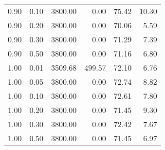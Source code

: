 \begin{table}
\begin{tabular}{rrrrrr}
0.90 & 0.10 & 3800.00 & 0.00 & 75.42 & 10.30 \\
0.90 & 0.20 & 3800.00 & 0.00 & 70.06 & 5.59 \\
0.90 & 0.30 & 3800.00 & 0.00 & 71.29 & 7.39 \\
0.90 & 0.50 & 3800.00 & 0.00 & 71.16 & 6.80 \\
1.00 & 0.01 & 3509.68 & 499.57 & 72.10 & 6.76 \\
1.00 & 0.05 & 3800.00 & 0.00 & 72.74 & 8.82 \\
1.00 & 0.10 & 3800.00 & 0.00 & 72.61 & 7.80 \\
1.00 & 0.20 & 3800.00 & 0.00 & 71.45 & 9.30 \\
1.00 & 0.30 & 3800.00 & 0.00 & 72.42 & 7.67 \\
1.00 & 0.50 & 3800.00 & 0.00 & 71.45 & 6.97 \\
\bottomrule
\end{tabular}
\end{table}
